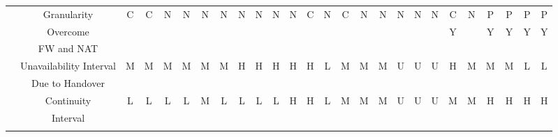 \documentclass[preprint,12pt]{elsarticle}
\begin{document}
\begin{landscape}
\begin{table*}[t]
\begin{tabular}{|c|c|c|c|c|c|c|c|c|c|c|c|c|c|c|c|c|c|c|c|c|c|c|c|c|c|}
  \hhline{~-------------------------}
    & \multirow{2}{*}{Granularity} & \multirow{2}{*}{C} & 
	      \multirow{2}{*}{C} & \multirow{2}{*}{N} & \multirow{2}{*}{N} & \multirow{2}{*}{N} & \multirow{2}{*}{N} & \multirow{2}{*}{N} & \multirow{2}{*}{N} &  \multirow{2}{*}{N} & \multirow{2}{*}{N} & \multirow{2}{*}{C} & 
	      \multirow{2}{*}{N} & \multirow{2}{*}{C} & \multirow{2}{*}{N} & \multirow{2}{*}{N} &
	      \multirow{2}{*}{N} & \multirow{2}{*}{N} & \multirow{2}{*}{N} & \multirow{2}{*}{C} & 
	      \multirow{2}{*}{N} & \multirow{2}{*}{P} & \multirow{2}{*}{P} & \multirow{2}{*}{P} & 
	      \multirow{2}{*}{P} \\
    & & & & & & & & & & & & & & & & & & & & & & & & &\\
  \hhline{~-------------------------}
    & Overcome & & & & & &   & & & & & & & 
	       & &  &  & & & \multirow{2}{*}{Y} & & \multirow{2}{*}{Y} & \multirow{2}{*}{Y} & 
	      \multirow{2}{*}{Y} & \multirow{2}{*}{Y} \\
    & FW and NAT & & & & &  & & & & & & & & & & & & & & & & & & &\\
  \hhline{~-------------------------}
    & Unavailability Interval &  M & M & \multirow{2}{*}{M} &
	      \multirow{2}{*}{M} & \multirow{2}{*}{M} & \multirow{2}{*}{M} & 
	      \multirow{2}{*}{H} & \multirow{2}{*}{H} & \multirow{2}{*}{H} & 
	      \multirow{2}{*}{H} &  \multirow{2}{*}{H} & \multirow{2}{*}{L} & 
M & M & M & \multirow{2}{*}{U} & \multirow{2}{*}{U} & \multirow{2}{*}{U} 
	      & H & \multirow{2}{*}{M} & \multirow{2}{*}{M} & \multirow{2}{*}{M} & 
	      \multirow{2}{*}{L} & \multirow{2}{*}{L} \\
    & Due to Handover &  &   &  & & & & & & & & & & 
	       &  &  & & & &  & & & & & \\
  \hhline{~-------------------------}
    & Continuity & \multirow{2}{*}{L} & \multirow{2}{*}{L} & \multirow{2}{*}{L} & 
	      \multirow{2}{*}{L} & \multirow{2}{*}{M} & \multirow{2}{*}{L} & 
	      \multirow{2}{*}{L} & \multirow{2}{*}{L} & \multirow{2}{*}{L} & 
	      \multirow{2}{*}{H} &  \multirow{2}{*}{H} 
	      & \multirow{2}{*}{L} & 
	      \multirow{2}{*}{M} & \multirow{2}{*}{M} & \multirow{2}{*}{M} & 
\multirow{2}{*}{U} & \multirow{2}{*}{U} & \multirow{2}{*}{U} & 
	      \multirow{2}{*}{M} & \multirow{2}{*}{M} & \multirow{2}{*}{H} & 
	      \multirow{2}{*}{H} & \multirow{2}{*}{H} & \multirow{2}{*}{H} \\
    & Interval & & & & & & & & &  & & & & & & & & & & & & & & &\\
  \hhline{~-------------------------}

\end{tabular}
\end{table*}
\end{landscape}
\end{document}
